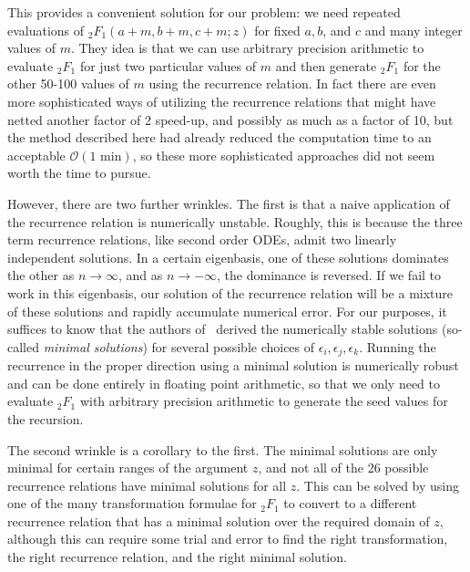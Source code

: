 This provides a convenient solution for our problem: we need repeated
evaluations of ${_2F_1}(a+m, b+m, c+m; z)$
for fixed $a,b$, and $c$ and many integer values of $m$.
They idea is that we can use arbitrary precision arithmetic to evaluate
${_2F_1}$ for just two particular values of $m$ and then generate
${_2F_1}$ for the other 50-100 values of $m$ using the recurrence
relation.
In fact there are even more sophisticated ways of utilizing the recurrence
relations that might have netted another factor of 2 speed-up, and
possibly as much as a factor of 10, but the method described here had
already reduced the computation time to an acceptable
$\mathcal{O}(\text{1 min})$, so these more sophisticated approaches did
not seem worth the time to pursue.

However, there are two further wrinkles.
The first is that
a naive application of the recurrence relation is numerically unstable.
Roughly, this is because the three term recurrence relations,
like second order ODEs, admit two linearly independent solutions.
In a certain eigenbasis, one of these solutions dominates the other
as $n\rightarrow\infty$, and as $n\rightarrow-\infty$,
the dominance is reversed.
If we fail to work in this eigenbasis, our solution of the recurrence relation
will be a mixture of these solutions and rapidly accumulate numerical error.
For our purposes, it suffices to know that the authors of~\cite{Gil2007}
derived the numerically stable solutions (so-called \textit{minimal solutions})
for several possible choices of $\epsilon_i, \epsilon_j, \epsilon_k$.
Running the recurrence in the proper direction using a minimal solution
is numerically robust and can be done entirely in floating point arithmetic, 
so that we only need to evaluate ${_2F_1}$ with arbitrary precision arithmetic
to generate the seed values for the recursion.

The second wrinkle is a corollary to the first.
The minimal solutions are only minimal for certain ranges of the argument $z$,
and not all of the 26 possible recurrence relations
have minimal solutions for all $z$.
This can be solved by using one of the many transformation formulae for
${_2F_1}$ to convert to a different recurrence relation that has
a minimal solution over the required domain of $z$, although
this can require some trial and error to find the right transformation,
the right recurrence relation, and the right minimal solution.

